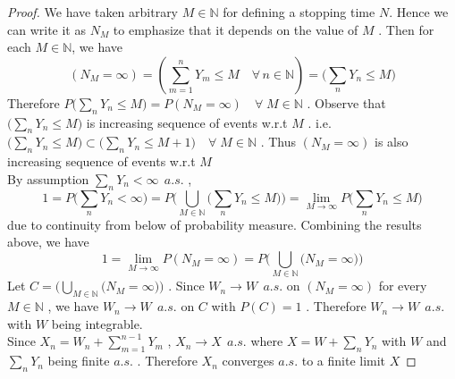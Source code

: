 \documentclass[12pt, A4]{article}
\newcommand{\N}{\mathbb{N}}
\newcommand{\foranyn}{\quad \forall \, n\in \N}
\begin{document}
\begin{proof}
    We have taken arbitrary $M\in \N$ for defining a stopping time $N$. Hence we can write it as $N_M$ to emphasize that it depends on the value of $M$ . Then for each $M\in \N$, we have $$(N_M=\infty) = (\sum_{m=1}^n Y_m\leq M \foranyn)= \Big(\sum_{n}Y_n\leq M\Big) $$ Therefore $P\Big(\sum_{n}Y_n\leq M\Big)= P(N_M=\infty) \quad \forall \; M\in \N$ . Observe that $\Big(\sum_{n}Y_n\leq M\Big)$ is increasing sequence of events w.r.t $M$ . i.e.  $\Big(\sum_{n}Y_n\leq M\Big)\subset \Big(\sum_{n}Y_n\leq M+1\Big)\quad \forall \; M\in \N$ . Thus $(N_M=\infty)$ is also increasing sequence of events w.r.t $M$ \\ By assumption $\sum_n Y_n<\infty\;\, a.s.$ , $$1=P\Big(\sum_n Y_n<\infty \Big)=P\Big(\bigcup_{M\in \N}\big(\sum_n Y_n\leq M \big)\Big)=\lim_{M\rightarrow \infty} P\Big(\sum_n Y_n\leq M\Big)$$
    due to continuity from below of probability measure. Combining the results above, we have $$1=\lim_{M\rightarrow \infty}P(N_M=\infty)=P\Big(\bigcup_{M\in \N}\big( N_M=\infty\big)\Big) $$ Let $C=\Big(\bigcup_{M\in \N}\big( N_M=\infty\big)\Big)$ . Since $W_n\rightarrow W\;\, a.s.$ on $(N_M=\infty)$ for every $M\in \N$ , we have $W_n\rightarrow W\;\,a.s.$ on $C$ with $P(C)=1$ . Therefore $W_n\rightarrow W\;\,a.s.$ with $W$ being integrable. \\ Since $X_n= W_n+\sum_{m=1}^{n-1} Y_m$ , $X_n\rightarrow X\;\,a.s.$ where $X=W+\sum_n Y_n$ with $W$ and $\sum_n Y_n$ being finite $a.s.$ . Therefore $X_n$ converges $a.s.$ to a finite limit $X$
\end{proof}
\vspace{1cm}
\end{document}
